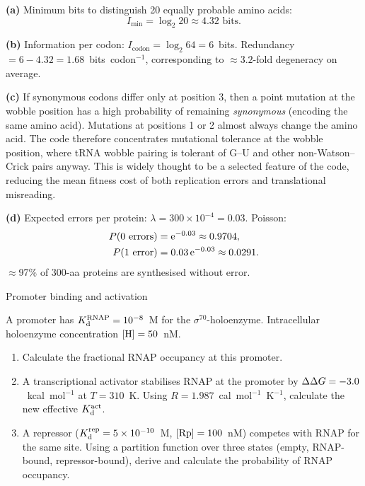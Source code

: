 \documentclass[12pt, a4paper, oneside]{report}
\begin{document}
\begin{solution}
  \textbf{(a)} Minimum bits to distinguish 20 equally probable amino acids:
  \[
    I_\text{min} = \log_2 20 \approx 4.32 \text{ bits.}
  \]

  \textbf{(b)} Information per codon:
  $I_\text{codon} = \log_2 64 = 6$~bits.
  Redundancy $= 6 - 4.32 = 1.68$~bits~codon$^{-1}$, corresponding to
  $\approx 3.2$-fold degeneracy on average.

  \textbf{(c)} If synonymous codons differ only at position 3, then a
  point mutation at the wobble position has a high probability of remaining
  \emph{synonymous} (encoding the same amino acid). Mutations at positions
  1 or 2 almost always change the amino acid. The code therefore concentrates
  mutational tolerance at the wobble position, where tRNA wobble pairing
  is tolerant of G--U and other non-Watson--Crick pairs anyway. This is
  widely thought to be a selected feature of the code, reducing the mean
  fitness cost of both replication errors and translational misreading.

  \textbf{(d)} Expected errors per protein: $\lambda = 300 \times 10^{-4} = 0.03$.
  Poisson:
  \begin{align*}
    P(0 \text{ errors}) &= \mathrm{e}^{-0.03} \approx 0.9704, \\
    P(1 \text{ error})  &= 0.03\,\mathrm{e}^{-0.03} \approx 0.0291.
  \end{align*}
  $\approx$97\% of 300-aa proteins are synthesised without error.
\end{solution}

\begin{problem}{\enspace{}\enspace{}\enspace Promoter binding and activation}

  A promoter has $K_{\mathrm{d}}^\text{RNAP} = 10^{-8}$~M for the
  $\sigma^{70}$-holoenzyme. Intracellular holoenzyme concentration
  $[\mathrm{H}] = 50$~nM.

  \begin{enumerate}
    \item Calculate the fractional RNAP occupancy at this promoter.
    \item A transcriptional activator stabilises RNAP at the promoter by
          $\Delta\Delta G = -3.0$~kcal~mol$^{-1}$ at $T = 310$~K.
          Using $R = 1.987$~cal~mol$^{-1}$~K$^{-1}$, calculate the new
          effective $K_{\mathrm{d}}^\text{act}$.
    \item A repressor ($K_{\mathrm{d}}^\text{rep} = 5\times10^{-10}$~M,
          $[\mathrm{Rp}] = 100$~nM) competes with RNAP for the same site.
          Using a partition function over three states (empty, RNAP-bound,
          repressor-bound), derive and calculate the probability of RNAP
          occupancy.
  \end{enumerate}
\end{problem}
\end{document}
